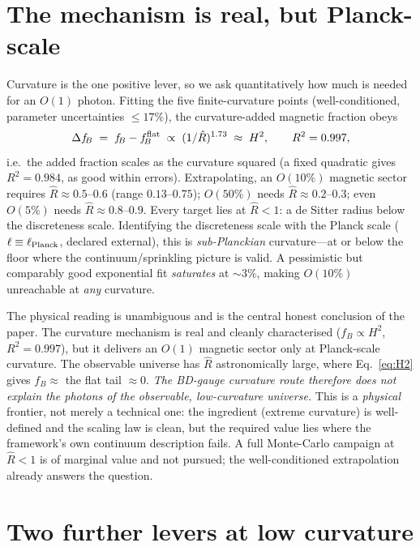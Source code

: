 \documentclass[aps,prd,reprint,nofootinbib,superscriptaddress,floatfix]{revtex4-2}
\newcommand{\Rhat}{\hat R}
\newcommand{\fracB}{f_{\!B}}
\begin{document}
\section{The mechanism is real, but Planck-scale}\label{sec:frontier}

Curvature is the one positive lever, so we ask quantitatively how much is needed for an
$O(1)$ photon. Fitting the five finite-curvature points (well-conditioned, parameter
uncertainties $\le17\%$), the curvature-added magnetic fraction obeys
\begin{equation}
\Delta\fracB \;=\; \fracB-\fracB^{\rm flat}\;\propto\;(1/\Rhat)^{1.73}\;\approx\;H^2,
\qquad R^2=0.997,
\label{eq:H2}
\end{equation}
i.e.\ the added fraction scales as the curvature squared (a fixed quadratic gives
$R^2=0.984$, as good within errors). Extrapolating, an $O(10\%)$ magnetic sector requires
$\Rhat\approx0.5$--$0.6$ (range $0.13$--$0.75$); $O(50\%)$ needs $\Rhat\approx0.2$--$0.3$;
even $O(5\%)$ needs $\Rhat\approx0.8$--$0.9$. Every target lies at $\Rhat<1$: a de Sitter
radius below the discreteness scale. Identifying the discreteness scale with the Planck
scale ($\ell\equiv\ell_{\rm Planck}$, declared external), this is \emph{sub-Planckian}
curvature---at or below the floor where the continuum/sprinkling picture is valid. A
pessimistic but comparably good exponential fit \emph{saturates} at $\sim3\%$, making
$O(10\%)$ unreachable at \emph{any} curvature.

The physical reading is unambiguous and is the central honest conclusion of the paper.
The curvature mechanism is real and cleanly characterised ($\fracB\propto H^2$,
$R^2=0.997$), but it delivers an $O(1)$ magnetic sector only at Planck-scale curvature.
The observable universe has $\Rhat$ astronomically large, where Eq.~\eqref{eq:H2} gives
$\fracB\approx$ the flat tail $\approx0$. \emph{The BD-gauge curvature route therefore
does not explain the photons of the observable, low-curvature universe.} This is a
\emph{physical} frontier, not merely a technical one: the ingredient (extreme curvature)
is well-defined and the scaling law is clean, but the required value lies where the
framework's own continuum description fails. A full Monte-Carlo campaign at $\Rhat<1$ is
of marginal value and not pursued; the well-conditioned extrapolation already answers the
question.

\section{Two further levers at low curvature}\label{sec:further}
\end{document}
